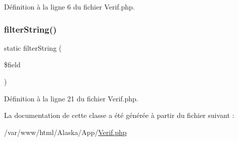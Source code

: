 Définition à la ligne 6 du fichier Verif.\+php.

\mbox{\label{class_app_1_1_verif_a99f773813353109ce02b4796ddd49467}} 
\subsubsection{\texorpdfstring{filter\+String()}{filterString()}}
{\footnotesize\ttfamily static filter\+String (\begin{DoxyParamCaption}\item[{}]{\$field }\end{DoxyParamCaption})\hspace{0.3cm}{\ttfamily [static]}}



Définition à la ligne 21 du fichier Verif.\+php.



La documentation de cette classe a été générée à partir du fichier suivant \+:\begin{DoxyCompactItemize}
\item 
/var/www/html/\+Alaska/\+App/\hyperlink{_verif_8php}{Verif.\+php}\end{DoxyCompactItemize}
